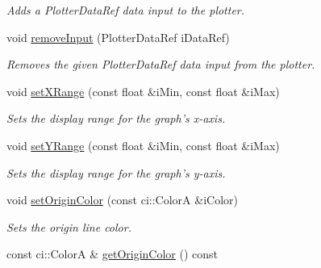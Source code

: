 \begin{DoxyCompactItemize}
\begin{DoxyCompactList}\small\item\em Adds a Plotter\-Data\-Ref data input to the plotter. \end{DoxyCompactList}\item 
\hypertarget{class_ui_plot_ad7d60f211a1f293764b768a940efd4d9}{void \hyperlink{class_ui_plot_ad7d60f211a1f293764b768a940efd4d9}{remove\-Input} (Plotter\-Data\-Ref i\-Data\-Ref)}\label{class_ui_plot_ad7d60f211a1f293764b768a940efd4d9}

\begin{DoxyCompactList}\small\item\em Removes the given Plotter\-Data\-Ref data input from the plotter. \end{DoxyCompactList}\item 
\hypertarget{class_ui_plot_a04a2f95322177958db575e14ee91200b}{void \hyperlink{class_ui_plot_a04a2f95322177958db575e14ee91200b}{set\-X\-Range} (const float \&i\-Min, const float \&i\-Max)}\label{class_ui_plot_a04a2f95322177958db575e14ee91200b}

\begin{DoxyCompactList}\small\item\em Sets the display range for the graph's x-\/axis. \end{DoxyCompactList}\item 
\hypertarget{class_ui_plot_afb652ac5db1abf7154b3ed022d86c4fc}{void \hyperlink{class_ui_plot_afb652ac5db1abf7154b3ed022d86c4fc}{set\-Y\-Range} (const float \&i\-Min, const float \&i\-Max)}\label{class_ui_plot_afb652ac5db1abf7154b3ed022d86c4fc}

\begin{DoxyCompactList}\small\item\em Sets the display range for the graph's y-\/axis. \end{DoxyCompactList}\item 
\hypertarget{class_ui_plot_a509b759eb6b3f5dbc740e8ef0e28b824}{void \hyperlink{class_ui_plot_a509b759eb6b3f5dbc740e8ef0e28b824}{set\-Origin\-Color} (const ci\-::\-Color\-A \&i\-Color)}\label{class_ui_plot_a509b759eb6b3f5dbc740e8ef0e28b824}

\begin{DoxyCompactList}\small\item\em Sets the origin line color. \end{DoxyCompactList}\item 
\hypertarget{class_ui_plot_ac0777f9e0551f2280b485d57a5f11824}{const ci\-::\-Color\-A \& \hyperlink{class_ui_plot_ac0777f9e0551f2280b485d57a5f11824}{get\-Origin\-Color} () const }\label{class_ui_plot_ac0777f9e0551f2280b485d57a5f11824}


\end{DoxyCompactItemize}
